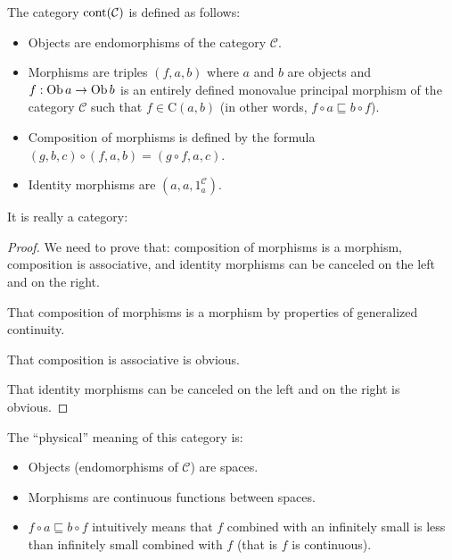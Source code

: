 \begin{defn}
  The category $\operatorname{cont} (\mathcal{C})$ is defined as follows:
  \begin{itemize}
    \item Objects are endomorphisms of the category $\mathcal{C}$.
    
    \item Morphisms are triples $(f , a , b)$ where $a$ and $b$ are objects
    and $f : \operatorname{Ob} a \rightarrow \operatorname{Ob} b$ is an entirely defined
    monovalue principal morphism of the category $\mathcal{C}$ such that $f
    \in \mathrm{C} (a , b)$ (in other words, $f \circ a \sqsubseteq b \circ
    f$).
    
    \item Composition of morphisms is defined by the formula $(g , b , c)
    \circ (f , a , b) = (g \circ f , a , c)$.
    
    \item Identity morphisms are $(a , a , 1^{\mathcal{C}}_a)$.
  \end{itemize}
\end{defn}

It is really a category:

\begin{proof}
  We need to prove that: composition of morphisms is a morphism, composition
  is associative, and identity morphisms can be canceled on the left and on
  the right.
  
  That composition of morphisms is a morphism by properties of generalized
  continuity.
  
  That composition is associative is obvious.
  
  That identity morphisms can be canceled on the left and on the right is
  obvious.
\end{proof}

\begin{rem}
  The ``physical'' meaning of this category is:
  \begin{itemize}
    \item Objects (endomorphisms of $\mathcal{C}$) are spaces.
    
    \item Morphisms are continuous functions between spaces.
    
    \item $f \circ a \sqsubseteq b \circ f$ intuitively means that $f$
    combined with an infinitely small is less than infinitely small combined
    with $f$ (that is $f$ is continuous).
  \end{itemize}
\end{rem}

